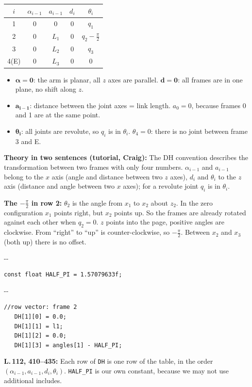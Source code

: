 \documentclass[10pt,a4paper]{article}
\makeatletter
\newcommand{\secneed}[1]{\par\penalty\@M\begingroup\setlength{\dimen@}{#1}\dimen@ii\pagegoal
  \advance\dimen@ii-\pagetotal\ifdim\dimen@>\dimen@ii\ifdim\dimen@ii>\z@\vfil\fi\penalty-\@M\fi\endgroup}
\newcommand{\code}[1]{\texttt{#1}}
\makeatother
\begin{document}
\begin{center}
\begin{tabular}{ccccc}
  \toprule
  $i$ & $\alpha_{i-1}$ & $a_{i-1}$ & $d_i$ & $\theta_i$ \\
  \midrule
  1    & 0 & 0     & 0 & $q_1$ \\
  2    & 0 & $L_1$ & 0 & $q_2 - \frac{\pi}{2}$ \\
  3    & 0 & $L_2$ & 0 & $q_3$ \\
  4(E) & 0 & $L_3$ & 0 & 0 \\
  \bottomrule
\end{tabular}
\end{center}
\vspace{-6pt}
\begin{itemize}
  \item $\boldsymbol{\alpha = 0}$: the arm is planar, all $z$ axes are parallel. $\boldsymbol{d = 0}$: all frames are in
        one plane, no shift along $z$.
  \item $\boldsymbol{a_{i-1}}$: distance between the joint axes = link length. $a_0 = 0$, because frames 0 and 1 are at
        the same point.
  \item $\boldsymbol{\theta_i}$: all joints are revolute, so $q_i$ is in $\theta_i$. $\theta_4 = 0$: there is no joint
        between frame 3 and E.
\end{itemize}

\textbf{Theory in two sentences (tutorial, Craig):} The DH convention describes the transformation between two frames
with only four numbers. $\alpha_{i-1}$ and $a_{i-1}$ belong to the $x$ axis (angle and distance between two $z$ axes),
$d_i$ and $\theta_i$ to the $z$ axis (distance and angle between two $x$ axes); for a revolute joint $q_i$ is in
$\theta_i$.

\textbf{The $-\frac{\pi}{2}$ in row 2:} $\theta_2$ is the angle from $x_1$ to $x_2$ about $z_2$. In the zero configuration
$x_1$ points right, but $x_2$ points up. So the frames are already rotated against each other when $q_2 = 0$. $z$ points
into the page, positive angles are clockwise. From ``right'' to ``up'' is counter-clockwise, so $-\frac{\pi}{2}$. Between
$x_2$ and $x_3$ (both up) there is no offset.

\secneed{2\baselineskip}
\begin{lstlisting}[firstnumber=112]
const float HALF_PI = 1.57079633f;
\end{lstlisting}
\vspace{-4pt}
\secneed{6\baselineskip}
\begin{lstlisting}[firstnumber=418]
   //row vector: frame 2
   DH[1][0] = 0.0;
   DH[1][1] = l1;
   DH[1][2] = 0.0;
   DH[1][3] = angles[1] - HALF_PI;
\end{lstlisting}
\textbf{L.\,112, 410--435:} Each row of \code{DH} is one row of the table, in the order
$(\alpha_{i-1}, a_{i-1}, d_i, \theta_i)$. \code{HALF\_PI} is our own constant, because we may not use additional
includes.
\end{document}
